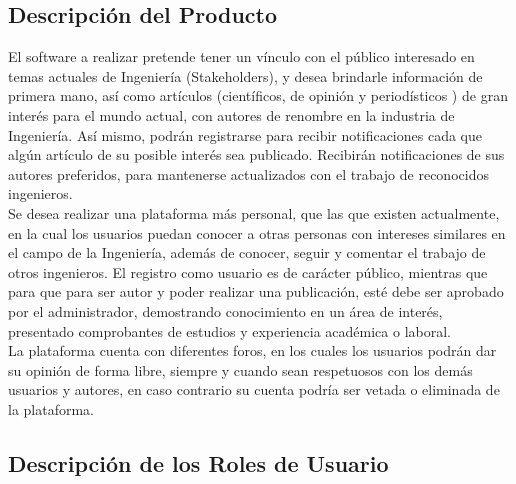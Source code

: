 \documentclass[a4paper,12 pt]{article}
\begin{document}
\subsection{Descripción del Producto}

El software a realizar pretende tener un vínculo con el público interesado en temas
actuales de Ingeniería (Stakeholders), y desea brindarle información de primera mano,
así como artículos (científicos, de opinión y periodísticos ) de gran interés para el
mundo actual, con autores de renombre en la industria de Ingeniería. Así mismo, podrán
registrarse para recibir notificaciones cada que algún artículo de su posible interés
sea publicado. Recibirán notificaciones de sus autores preferidos, para mantenerse
actualizados con el trabajo de reconocidos ingenieros.\\

Se desea realizar una plataforma más personal, que las que existen actualmente, en la
cual los usuarios puedan conocer a otras personas con intereses similares en el campo
de la Ingeniería, además de conocer, seguir y comentar el trabajo de otros ingenieros.
El registro como usuario es de carácter público, mientras que para que para ser autor y
poder realizar una publicación, esté debe ser aprobado por el administrador,
demostrando conocimiento en un área de interés, presentado comprobantes de estudios y
experiencia académica o laboral.\\

La plataforma cuenta con diferentes foros, en los cuales los usuarios podrán dar su
opinión de forma libre, siempre y cuando sean respetuosos con los demás usuarios y
autores, en caso contrario su cuenta podría ser vetada o eliminada de la plataforma.

\subsection{Descripción de los Roles de Usuario}
\end{document}

